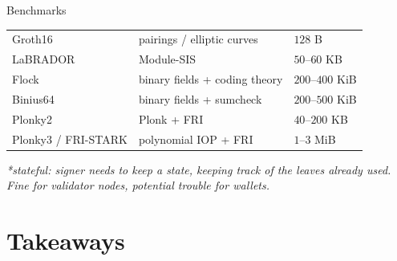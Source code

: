 \documentclass{beamer}
\theoremstyle{customstyle}
\begin{document}
\begin{frame}{Benchmarks}
{\begin{tabular}{lll}
    Groth16
      & pairings / elliptic curves
      & $128$ B \\

    LaBRADOR
      & Module-SIS
      & $50$--$60$ KB \\

    Flock
      & binary fields + coding theory
      & $200$--$400$ KiB \\

    Binius64
      & binary fields + sumcheck
      & $200$--$500$ KiB \\

    Plonky2 & Plonk + FRI
      & $40$--$200$ KB \\

    Plonky3 / FRI-STARK
      & polynomial IOP + FRI
      & $1$--$3$ MiB \\

    \bottomrule
    \end{tabular}
  }

  \vspace*{0.5cm}
  \tiny{\emph{*stateful: signer needs to keep a state, keeping track of the leaves already used. Fine for validator nodes, potential trouble for wallets.}}
\end{frame}


\section[Takeaways]{Takeaways}
\end{document}
